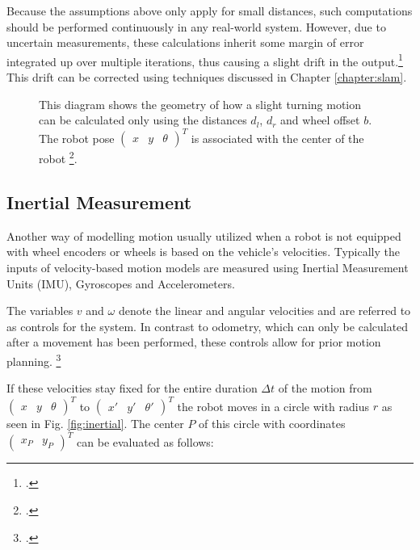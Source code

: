 Because the assumptions above only apply for small distances, such computations should be performed continuously in any real-world system. However, due to uncertain measurements, these calculations inherit some margin of error integrated up over multiple iterations, thus causing a slight drift in the output.\footcite[Pages 69 - 77]{ben2017elements} 
This drift can be corrected using techniques discussed in Chapter \ref{chapter:slam}.

\begin{figure}
	\centering
	
	\caption{
		This diagram shows the geometry of how a slight turning motion can be calculated only using the distances $d_{l}$, $d_{r}$ and wheel offset $b$.
		The robot pose 
		$
			\begin{pmatrix}
				x &
				y &
				\theta 
			\end{pmatrix}^{T}
		$
		is associated with the center of the robot \footcite{ben2017elements}.
	}
	\label{fig:odom}
\end{figure}


\subsection{Inertial Measurement}
Another way of modelling motion usually utilized when a robot is not equipped with wheel encoders or wheels is based on the vehicle's velocities. Typically the inputs of velocity-based motion models are measured using Inertial Measurement Units (IMU), Gyroscopes and Accelerometers. 

The variables $v$ and $\omega$ denote the linear and angular velocities and are referred to as controls for the system. 
In contrast to odometry, which can only be calculated after a movement has been performed, these controls allow for prior motion planning. \footcite[Pages 92 - 99]{thrun2002probabilisticRobotics}

If these velocities stay fixed for the entire duration $\Delta t$ of the motion from 
$\begin{pmatrix} x & y & \theta \end{pmatrix}^{T}$
to
$\begin{pmatrix} x' & y' & \theta' \end{pmatrix}^{T}$
the robot moves in a circle with radius $r$ as seen in Fig. \ref{fig:inertial}. The center $P$ of this circle with coordinates 
$
\begin{pmatrix}
	x_{P} & y_{P}
\end{pmatrix}
^{T}
$
can be evaluated as follows:

